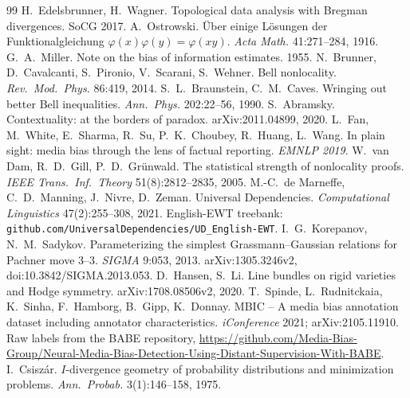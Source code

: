 \documentclass[11pt]{article}
\theoremstyle{definition}
\theoremstyle{remark}
\begin{document}
\begin{thebibliography}{99}
 H.~Edelsbrunner, H.~Wagner. Topological data analysis with Bregman divergences. SoCG 2017.
 A.~Ostrowski. \"Uber einige L\"osungen der Funktionalgleichung $\varphi(x)\varphi(y)=\varphi(xy)$. \emph{Acta Math.} 41:271--284, 1916.
 G.~A.~Miller. Note on the bias of information estimates. 1955.
 N.~Brunner, D.~Cavalcanti, S.~Pironio, V.~Scarani, S.~Wehner. Bell nonlocality. \emph{Rev.\ Mod.\ Phys.} 86:419, 2014.
 S.~L.~Braunstein, C.~M.~Caves. Wringing out better Bell inequalities. \emph{Ann.\ Phys.} 202:22--56, 1990.
 S.~Abramsky. Contextuality: at the borders of paradox. arXiv:2011.04899, 2020.
 L.~Fan, M.~White, E.~Sharma, R.~Su, P.~K.~Choubey, R.~Huang, L.~Wang. In plain sight: media bias through the lens of factual reporting. \emph{EMNLP 2019}.
 W.~van Dam, R.~D.~Gill, P.~D.~Gr\"unwald. The statistical strength of nonlocality proofs. \emph{IEEE Trans.\ Inf.\ Theory} 51(8):2812--2835, 2005.
 M.-C.~de Marneffe, C.~D.~Manning, J.~Nivre, D.~Zeman. Universal Dependencies. \emph{Computational Linguistics} 47(2):255--308, 2021. English-EWT treebank: \texttt{github.com/UniversalDependencies/UD\_English-EWT}.
 I.~G.~Korepanov, N.~M.~Sadykov. Parameterizing the simplest Grassmann--Gaussian relations for Pachner move 3--3. \emph{SIGMA} 9:053, 2013. arXiv:1305.3246v2, doi:10.3842/SIGMA.2013.053.
 D.~Hansen, S.~Li. Line bundles on rigid varieties and Hodge symmetry. arXiv:1708.08506v2, 2020.
 T.~Spinde, L.~Rudnitckaia, K.~Sinha, F.~Hamborg, B.~Gipp, K.~Donnay. MBIC -- A media bias annotation dataset including annotator characteristics. \emph{iConference} 2021; arXiv:2105.11910. Raw labels from the BABE repository, \url{https://github.com/Media-Bias-Group/Neural-Media-Bias-Detection-Using-Distant-Supervision-With-BABE}.
 I.~Csisz\'ar. $I$-divergence geometry of probability distributions and minimization problems. \emph{Ann.\ Probab.} 3(1):146--158, 1975.
\end{thebibliography}
\end{document}
